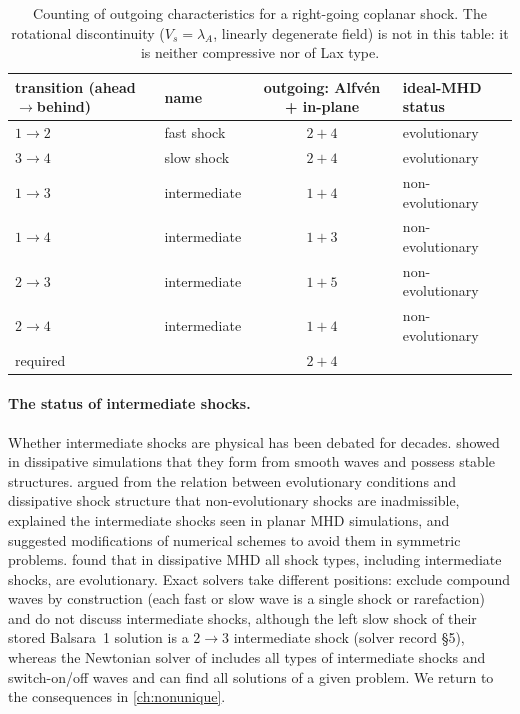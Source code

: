 \documentclass[11pt,a4paper,oneside,openany]{book}
\newcommand{\textcite}{\citet}
\theoremstyle{definition}
\theoremstyle{plain}
\theoremstyle{remark}
\begin{document}
\begin{table}[t]
\centering\small
\begin{tabular}{@{}llcl@{}}
\toprule
transition (ahead$\to$behind) & name & outgoing: Alfvén + in-plane & ideal-MHD status\\
\midrule
$1\to2$ & fast shock & $2+4$ & evolutionary\\
$3\to4$ & slow shock & $2+4$ & evolutionary\\
$1\to3$ & intermediate & $1+4$ & non-evolutionary\\
$1\to4$ & intermediate & $1+3$ & non-evolutionary\\
$2\to3$ & intermediate & $1+5$ & non-evolutionary\\
$2\to4$ & intermediate & $1+4$ & non-evolutionary\\
\midrule
required & & $2+4$ &\\
\bottomrule
\end{tabular}
\caption{Counting of outgoing characteristics for a right-going coplanar shock. The
rotational discontinuity ($V_s=\lambda_A$, linearly degenerate field) is not in this
table: it is neither compressive nor of Lax type.}
\label{tab:shocks}
\end{table}

\paragraph{The status of intermediate shocks.} Whether intermediate shocks are physical
has been debated for decades. \textcite{Wu1987,Wu1988,Wu1990} showed in dissipative
simulations that they form from smooth waves and possess stable structures.
\textcite{FalleKomissarov2001} argued from the relation between evolutionary conditions and
dissipative shock structure that non-evolutionary shocks are inadmissible, explained the
intermediate shocks seen in planar MHD simulations, and suggested modifications of numerical
schemes to avoid them in symmetric problems. \textcite{InoueInutsuka2007} found that in
dissipative MHD all shock types, including intermediate shocks, are evolutionary. Exact
solvers take different positions: \textcite{GiacomazzoRezzolla2006} exclude compound waves
by construction (each fast or slow wave is a single shock or rarefaction) and do not discuss
intermediate shocks, although the left slow shock of their stored Balsara~1 solution is a
$2\to3$ intermediate shock (solver record \S5), whereas the Newtonian solver of
\textcite{TakahashiYamada2014} includes all types of intermediate shocks and switch-on/off
waves and can find all solutions of a given problem. We return to the consequences in
\cref{ch:nonunique}.
\end{document}
